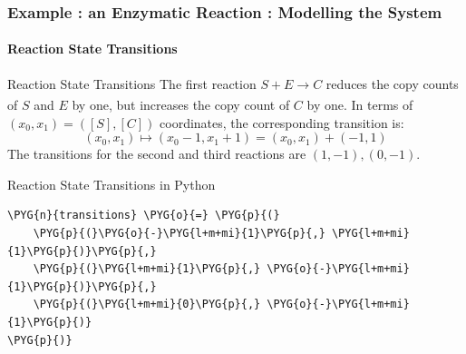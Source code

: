 \documentclass[hyperref={colorlinks=true}]{beamer}
\begin{document}
\begin{frame}[fragile]
\frametitle{Example : an Enzymatic Reaction : Modelling the System}
\framesubtitle{Reaction State Transitions}
\begin{block}{Reaction State Transitions}
The first reaction $S + E \xrightarrow[]{} C$ reduces the copy counts of
$S$ and $E$ by one, but increases the copy count of $C$ by one.
In terms of $(x_0, x_1) = ([S], [C])$ coordinates, the corresponding transition
is:
\begin{equation*}
(x_0, x_1) \mapsto (x_0 - 1, x_1 + 1) = (x_0, x_1) + (-1, 1)
\end{equation*}
The transitions for the second and third reactions are
$(1, -1), (0, -1)$.
\end{block}
\begin{block}{Reaction State Transitions in Python}
\begin{Verbatim}[commandchars=\\\{\}]
\PYG{n}{transitions} \PYG{o}{=} \PYG{p}{(}
    \PYG{p}{(}\PYG{o}{-}\PYG{l+m+mi}{1}\PYG{p}{,} \PYG{l+m+mi}{1}\PYG{p}{)}\PYG{p}{,}
    \PYG{p}{(}\PYG{l+m+mi}{1}\PYG{p}{,} \PYG{o}{-}\PYG{l+m+mi}{1}\PYG{p}{)}\PYG{p}{,}
    \PYG{p}{(}\PYG{l+m+mi}{0}\PYG{p}{,} \PYG{o}{-}\PYG{l+m+mi}{1}\PYG{p}{)}
\PYG{p}{)}
\end{Verbatim}
\end{block}
\end{frame}
\end{document}
